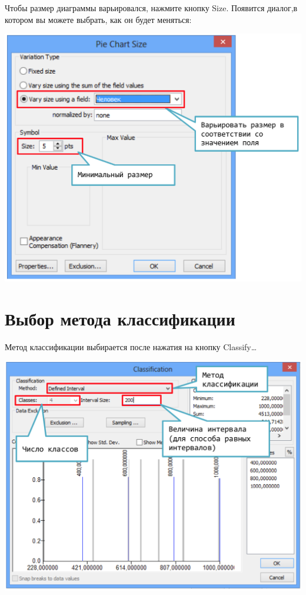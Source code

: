 \documentclass[12pt,]{book}
\begin{document}
Чтобы размер диаграммы варьировался, нажмите кнопку Size. Появится диалог,в котором вы можете выбрать, как он будет меняться:

\includegraphics{images/Appendix/image23.png}

\hypertarget{manual-vector-classes}{%
\section{Выбор метода классификации}\label{manual-vector-classes}}

Метод классификации выбирается после нажатия на кнопку Classify\ldots{}

\includegraphics{images/Appendix/image24.png}
\end{document}
